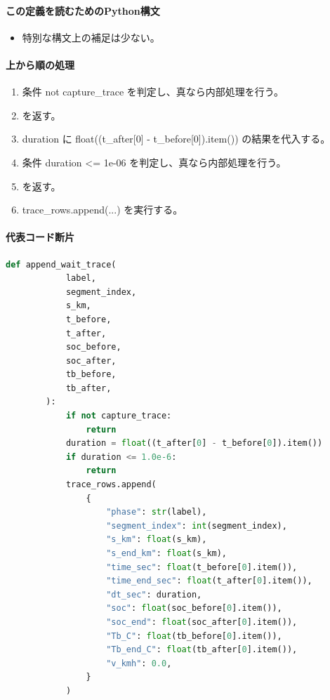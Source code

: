 \documentclass[a4paper,11pt]{article}
\begin{document}
            \paragraph{この定義を読むためのPython構文}
            \begin{itemize}[leftmargin=1.6em]
            \item 特別な構文上の補足は少ない。
            \end{itemize}
            \paragraph{上から順の処理}
            \begin{enumerate}[leftmargin=1.8em]
            \item 条件 not capture\_trace を判定し、真なら内部処理を行う。
\item    を返す。
\item duration に float((t\_after[0] - t\_before[0]).item()) の結果を代入する。
\item 条件 duration <= 1e-06 を判定し、真なら内部処理を行う。
\item    を返す。
\item trace\_rows.append(...) を実行する。
            \end{enumerate}
            \paragraph{代表コード断片}
            \begin{lstlisting}[language=Python]
        def append_wait_trace(
            label,
            segment_index,
            s_km,
            t_before,
            t_after,
            soc_before,
            soc_after,
            tb_before,
            tb_after,
        ):
            if not capture_trace:
                return
            duration = float((t_after[0] - t_before[0]).item())
            if duration <= 1.0e-6:
                return
            trace_rows.append(
                {
                    "phase": str(label),
                    "segment_index": int(segment_index),
                    "s_km": float(s_km),
                    "s_end_km": float(s_km),
                    "time_sec": float(t_before[0].item()),
                    "time_end_sec": float(t_after[0].item()),
                    "dt_sec": duration,
                    "soc": float(soc_before[0].item()),
                    "soc_end": float(soc_after[0].item()),
                    "Tb_C": float(tb_before[0].item()),
                    "Tb_end_C": float(tb_after[0].item()),
                    "v_kmh": 0.0,
                }
            )
\end{lstlisting}
\end{document}
